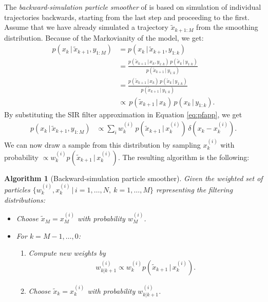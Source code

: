 \documentclass[twocolumn]{autart}    %
\newtheorem{algo}{Algorithm}[section]
\begin{document}
The {\em backward-simulation particle
smoother} of \cite{Godsill+Doucet+West:2004} is based on simulation of
individual trajectories backwards, starting from the last step and
proceeding to the first. Assume that we have already simulated a trajectory
$\tilde{x}_{k+1:M}$ from the smoothing distribution. Because of the
Markovianity of the model, we get:
%
\begin{equation}
\begin{split}
  p(x_{k}\,|\,\tilde{x}_{k+1},y_{1:M}) 
  &= p(x_{k}\,|\,\tilde{x}_{k+1},y_{1:k}) \\
  &= \frac{p(\tilde{x}_{k+1}\,|\,x_{k},y_{1:k}) \, p(\tilde{x}_{k}\,|\,y_{1:k})}
          {p(\tilde{x}_{k+1}\,|\,y_{1:k})} \\
  &= \frac{p(\tilde{x}_{k+1}\,|\,x_{k}) \, p(\tilde{x}_{k}\,|\,y_{1:k})}
          {p(\tilde{x}_{k+1}\,|\,y_{1:k})} \\
  &\propto \, p(\tilde{x}_{k+1}\,|\,x_{k}) \, p(x_{k}\,|\,y_{1:k}).
\end{split}
\end{equation}
%
By substituting the SIR filter approximation in Equation
\eqref{eq:pfapp}, we get
%
\begin{equation}
\begin{split}
   p(x_{k}\,|\,\tilde{x}_{k+1},y_{1:M}) 
   &\propto \sum_i w_k^{(i)} \, p(\tilde{x}_{k+1}\,|\,x_{k}^{(i)}) \,
   \delta(x_k - x_k^{(i)}).
\end{split}
\label{eq:backsimeq}
\end{equation}
%
We can now draw a sample from this distribution by sampling
$x_{k}^{(i)}$ with probability $\propto w_k^{(i)}
p(\tilde{x}_{k+1}\,|\,x_{k}^{(i)})$. The resulting algorithm is the
following:
%
\begin{algo}[Backward-simulation particle smoother]
  \label{alg:bssmooth} 
  Given the weighted set of particles $\{ w_k^{(i)}, x_k^{(i)} \,|\,
  i=1,\ldots,N,~k=1,\ldots,M \}$ representing the filtering
  distributions:
\begin{itemize}
\item Choose $\tilde{x}_M = x_M^{(i)}$ with probability $w^{(i)}_{M}$.
\item For $k=M-1,\ldots,0$:
\begin{enumerate}
  \item Compute new weights by
    \begin{equation}
      \begin{split}
        w^{(i)}_{k|k+1} \propto
        w_k^{(i)} p(\tilde{x}_{k+1}\,|\,x_{k}^{(i)}).
     \end{split}
    \end{equation}
  \item Choose $\tilde{x}_k = x_k^{(i)}$ with probability
    $w^{(i)}_{k|k+1}$.
  \end{enumerate}
\end{itemize}
\end{algo}
\end{document}
